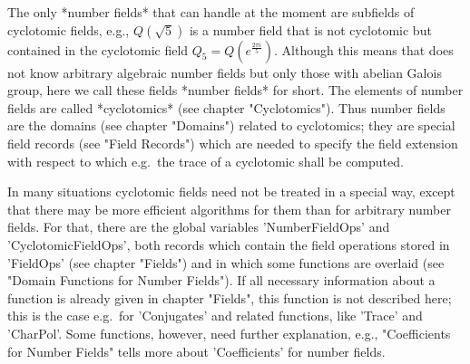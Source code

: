 
The only *number fields* that {\GAP} can handle at the moment are
subfields of cyclotomic fields, e.g., $Q(\sqrt{5})$ is a number field
that is not cyclotomic but contained in the cyclotomic field
$Q_5 = Q(e^{\frac{2\pi i}{5}})$.  Although this means that {\GAP} does
not know arbitrary algebraic number fields but only those with abelian
Galois group, here we call these fields *number fields* for short.
The elements of number fields are called *cyclotomics* (see chapter
"Cyclotomics").  Thus number fields are the domains (see chapter
"Domains") related to cyclotomics; they are special field records (see
"Field Records") which are needed to specify the field extension with
respect to which e.g.\ the trace of a cyclotomic shall be computed.

In many situations cyclotomic fields need not be treated in  a special
way, except that there  may be more efficient algorithms for them than
for arbitrary number fields.  For that, there are the global variables
'NumberFieldOps' and 'CyclotomicFieldOps',  both records which contain
the field  operations stored in 'FieldOps' (see chapter "Fields")  and
in which some functions are overlaid (see "Domain Functions for Number
Fields").  If all necessary  information  about a function is  already
given  in chapter "Fields", this function is  not described here; this
is the case e.g.\ for 'Conjugates' and related functions, like 'Trace'
and  'CharPol'.  Some functions,  however,  need  further explanation,
e.g., "Coefficients for Number Fields" tells more about 'Coefficients'
for number fields.

